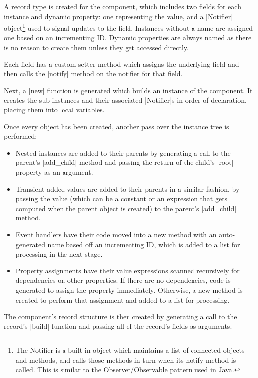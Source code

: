 \documentclass[11pt]{report}
\begin{document}
A record type is created for the component, which includes two fields for each instance and dynamic property: one representing the value, and a |Notifier| object\footnote{The Notifier is a built-in object which maintains a list of connected objects and methods, and calls those methods in turn when its notify method is called. This is similar to the Observer/Observable pattern used in Java.} used to signal updates to the field. Instances without a name are assigned one based on an incrementing ID. Dynamic properties are always named as there is no reason to create them unless they get accessed directly.

Each field has a custom setter method which assigns the underlying field and then calls the |notify| method on the notifier for that field.

Next, a |new| function is generated which builds an instance of the component. It creates the sub-instances and their associated |Notifier|s in order of declaration, placing them into local variables.

Once every object has been created, another pass over the instance tree is performed:

\begin{itemize}[topsep=0pt]
    \item Nested instances are added to their parents by generating a call to the parent's |add_child| method and passing the return of the child's |root| property as an argument.
    
    \item Transient added values are added to their parents in a similar fashion, by passing the value (which can be a constant or an expression that gets computed when the parent object is created) to the parent's |add_child| method.
    
    \item Event handlers have their code moved into a new method with an auto-generated name based off an incrementing ID, which is added to a list for processing in the next stage.
    
    \item Property assignments have their value expressions scanned recursively for dependencies on other properties. If there are no dependencies, code is generated to assign the property immediately. Otherwise, a new method is created to perform that assignment and added to a list for processing.
\end{itemize}

The component's record structure is then created by generating a call to the record's |build| function and passing all of the record's fields as arguments.
\end{document}
